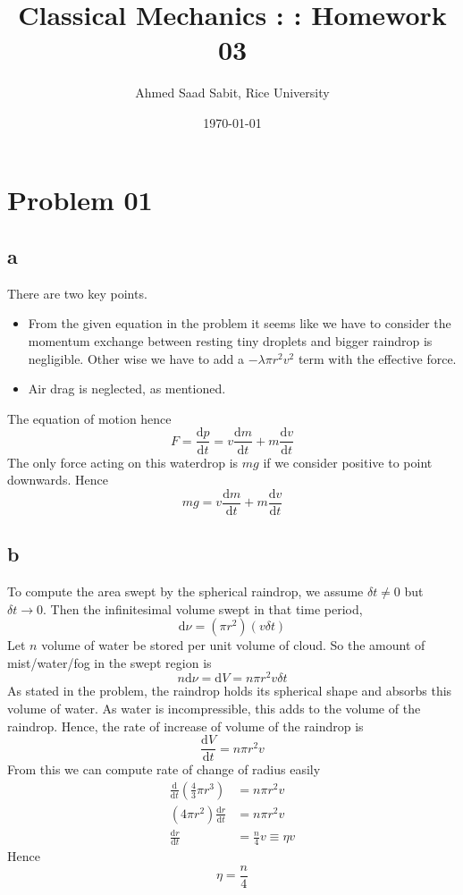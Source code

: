 \documentclass[letter]{article}
\title{Classical Mechanics : : Homework 03}
\author{Ahmed Saad Sabit, Rice University}
\date{\today}
\begin{document}
\maketitle

\section{Problem 01} 
\subsection{a}
There are two key points. 
\begin{itemize}
	\item From the given equation in the problem it seems like we have to consider the momentum exchange between resting tiny droplets and bigger raindrop is negligible. Other wise we have to add a $- \lambda \pi r^2 v^2$ term with the effective force. 
	\item Air drag is neglected, as mentioned.
\end{itemize}
The equation of motion hence
\[
F = \frac{\mathrm{d} p}{\mathrm{d} t} = v \frac{\mathrm{d} m}{\mathrm{d} t} + m \frac{\mathrm{d} v}{\mathrm{d} t}
\] 
The only force acting on this waterdrop is $mg$ if we consider positive to point downwards. Hence
\[
\boxed{
mg = v \frac{\mathrm{d} m}{\mathrm{d} t} + m \frac{\mathrm{d} v}{\mathrm{d} t}
}
\]

\subsection{b}
To compute the area swept by the spherical raindrop, we assume $\delta t \neq 0 $ but $\delta t \to  0$. Then the infinitesimal volume swept in that time period, 
\[
\mathrm{d} \nu = 	\left(\pi r^2\right) \left(v \delta t\right)
\]
Let $n$ volume of water be stored per unit volume of cloud. So the amount of mist/water/fog in the swept region is
\[
 n \mathrm{d} \nu = \mathrm{d} V = n \pi r^2 v \delta t 
\]
As stated in the problem, the raindrop holds its spherical shape and absorbs this volume of water. As water is incompressible, this adds to the volume of the raindrop. Hence, the rate of increase of volume of the raindrop is 
\[
	\frac{\mathrm{d} V}{\mathrm{d} t} = n \pi r^2 v
\]
From this we can compute rate of change of radius easily 
\begin{align*}
	\frac{\mathrm{d} }{\mathrm{d} t} \left(\frac{4}{3} \pi r^3\right) &= n \pi r^2 v \\
	(4 \pi r^2 )\frac{\mathrm{d} r}{\mathrm{d} t}&= n \pi r^2 v \\
	\frac{\mathrm{d} r}{\mathrm{d} t} &= \frac{n}{4} v \equiv \eta v
\end{align*}
Hence 
\[
\boxed{
\eta = \frac{n}{4}
}
\] 
\end{document}
